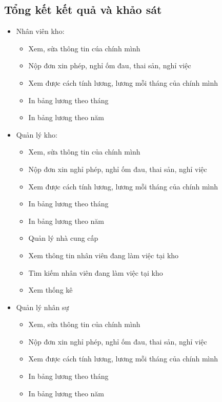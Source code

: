 \documentclass[a4paper,12pt]{report}
\begin{document}
\subsection{Tổng kết kết quả và khảo sát}
\begin{itemize}
    \item Nhân viên kho:
          \begin{itemize}
              \item Xem, sửa thông tin cúa chính mình
              \item Nộp đơn xin phép, nghỉ ốm đau, thai sản, nghỉ việc
              \item Xem được cách tính lương, lương mỗi tháng của chính mình
              \item In bảng lương theo tháng
              \item In bảng lương theo năm
          \end{itemize}
    \item Quản lý kho:
          \begin{itemize}
              \item Xem, sửa thông tin của chính mình
              \item Nộp đơn xin nghỉ phép, nghỉ ốm đau, thai sản, nghỉ việc
              \item Xem được cách tính lương, lương mỗi tháng của chính mình
              \item In bảng lương theo tháng
              \item In bảng lương theo năm
              \item Quản lý nhà cung cấp
              \item Xem thông tin nhân viên đang làm việc tại kho
              \item Tìm kiếm nhân viên đang làm việc tại kho
              \item Xem thống kê
          \end{itemize}
    \item Quản lý nhân sự
          \begin{itemize}
              \item Xem, sửa thông tin của chính mình
              \item Nộp đơn xin nghỉ phép, nghỉ ốm đau, thai sản, nghỉ việc
              \item Xem được cách tính lương, lương mỗi tháng của chính mình
              \item In bảng lương theo tháng
              \item In bảng lương theo năm

\end{itemize}
\end{itemize}
\end{document}
